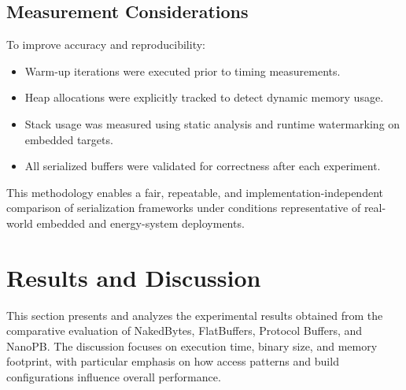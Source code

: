 \documentclass[11pt, a4paper]{article}
\begin{document}
\subsection{Measurement Considerations}

To improve accuracy and reproducibility:

\begin{itemize}
    \item Warm-up iterations were executed prior to timing measurements.
    \item Heap allocations were explicitly tracked to detect dynamic memory usage.
    \item Stack usage was measured using static analysis and runtime watermarking on embedded targets.
    \item All serialized buffers were validated for correctness after each experiment.
\end{itemize}

This methodology enables a fair, repeatable, and implementation-independent comparison of serialization frameworks under conditions representative of real-world embedded and energy-system deployments.

\section{Results and Discussion}
This section presents and analyzes the experimental results obtained from the comparative evaluation of NakedBytes, FlatBuffers, Protocol Buffers, and NanoPB. The discussion focuses on execution time, binary size, and memory footprint, with particular emphasis on how access patterns and build configurations influence overall performance.
\end{document}
